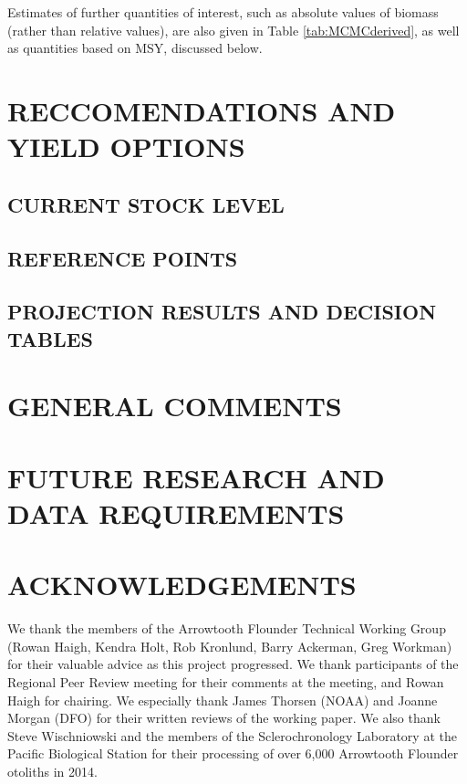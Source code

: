 \documentclass[11pt]{book}\usepackage[]{graphicx}\usepackage[]{color}
\begin{document}
Estimates of further quantities of interest, such as absolute values of biomass (rather than relative values), are also given in Table \ref{tab:MCMCderived}, as well as quantities based on MSY, discussed below.

\section{RECCOMENDATIONS AND YIELD OPTIONS}

\subsection{CURRENT STOCK LEVEL}

\subsection{REFERENCE POINTS}

\subsection{PROJECTION RESULTS AND DECISION TABLES}

\section{GENERAL COMMENTS}

\section{FUTURE RESEARCH AND DATA REQUIREMENTS}

\section{ACKNOWLEDGEMENTS}

We thank the members of the Arrowtooth Flounder Technical Working Group (Rowan Haigh, Kendra Holt, Rob Kronlund, Barry Ackerman, Greg Workman) for their valuable advice as this project progressed. We thank participants of the Regional Peer Review meeting for their comments at the meeting, and Rowan Haigh for chairing. We especially thank James Thorsen (NOAA) and Joanne Morgan (DFO) for their written reviews of the working paper. We also thank Steve Wischniowski and the members of the Sclerochronology Laboratory at the Pacific Biological Station for their processing of over 6,000 Arrowtooth Flounder otoliths in 2014.



\end{document}

